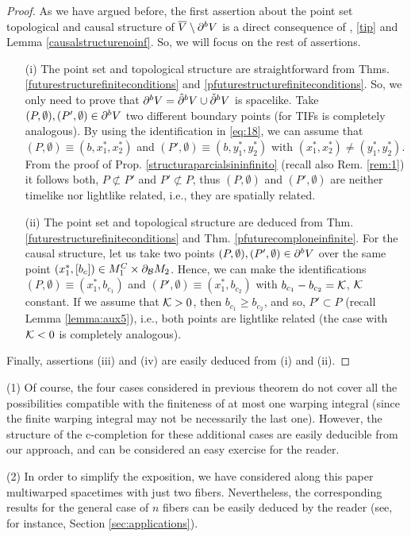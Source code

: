     \begin{proof}
As we have argued before, the first assertion about the point set topological and causal structure of $\overline{V}\setminus \partial^{{\color{black} b}}V$ is a direct consequence of , \ref{tip} and Lemma \ref{causalstructurenoinf}. So, we will focus on the rest of assertions.

  \begin{itemize}
  \item[(i)] The point set and topological structure are straightforward from Thms. \ref{futurestructurefiniteconditions} and \ref{pfuturestructurefiniteconditions}. So, we only need to prove that $\partial^{b}V=\hat{\partial}^{b}V\cup \check{\partial}^{b}V$ is spacelike. Take $(P,\emptyset),(P',\emptyset)\in \partial^{b}V$ two different boundary points (for TIFs is completely analogous). By using the identification in \eqref{eq:18}, we can assume that $(P,\emptyset)\equiv (b,x_1^*,x_2^*)$ and $(P',\emptyset)\equiv (b,y_1^*,y_2^*)$ with $(x_1^*,x_2^*)\neq (y_1^*,y_2^*)$. From the proof of Prop. \ref{structuraparcialsininfinito} (recall also Rem. \ref{rem:1}) it follows both, $P\not \subset P'$ and $P'\not \subset P$, thus $(P,\emptyset)$ and $(P',\emptyset)$ are neither timelike nor lightlike related, i.e., they are spatially related.

  \item[(ii)] The point set and topological structure are deduced from Thm. \ref{futurestructurefiniteconditions} and Thm. \ref{pfuturecomploneinfinite}. For the causal structure, let us take two points $(P,\emptyset),(P',\emptyset)\in \partial^{b}V$ over the same point $(x_1^*,[b_{c}])\in M_1^C \times \partial_{\cal B} M_2$. Hence, we can make the identifications $(P,\emptyset)\equiv (x_1^*,b_{c_1})$ and $(P',\emptyset)\equiv (x_1^*,b_{c_2})$ with $b_{c_1}-b_{c_2}={\cal K}$, ${\cal K}$ constant. If we assume that ${\cal K}>0$, then $b_{c_1}\geq b_{c_2}$, and so, $P'\subset P$ (recall Lemma \ref{lemma:aux5}), i.e., both points are lightlike related (the case with ${\cal K}<0$ is completely analogous).
  \end{itemize}

Finally, assertions (iii) and (iv) are easily deduced from (i) and (ii).

\end{proof}

\begin{rem} {\rm (1) Of course, the four cases considered in previous theorem do not cover all the possibilities compatible with the finiteness of at most one warping integral (since the finite warping integral may not be necessarily the last one). However, the structure of the c-completion for these additional cases are easily deducible from our approach, and can be considered an easy exercise for the reader.

(2) In order to simplify the exposition, we have considered along this paper multiwarped spacetimes with just two fibers. Nevertheless, the corresponding results for the general case of $n$ fibers can be easily deduced by the reader (see, for instance, Section \ref{sec:applications}).}
\end{rem}

